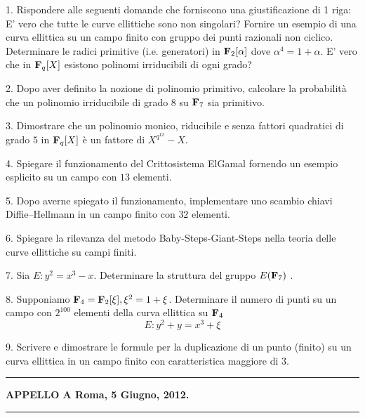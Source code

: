 \item{1.} Rispondere alle seguenti domande che forniscono una giustificazione di 1 riga:\bigskip
{} E' vero che tutte le curve ellittiche sono non singolari?
 Fornire un esempio di una curva ellittica su un campo finito con gruppo dei
punti razionali non ciclico.
 Determinare le radici primitive (i.e. generatori) in ${\bf F}_2[\alpha]$ dove $\alpha^4=1+\alpha$.
 E' vero che in ${\bf F}_q[X]$ esistono polinomi irriducibili di ogni grado?
\item{2.} Dopo aver definito la nozione di polinomio primitivo, calcolare la probabilit\`a che un polinomio irriducibile di grado $8$ su ${\bf F}_7$ sia 
primitivo.
\item{3.} Dimostrare che un polinomio monico, riducibile e senza fattori quadratici di grado $5$ in ${\bf F}_q[X]$ \`e un
fattore di $X^{q^{12}}-X$. \item{4.} Spiegare il funzionamento del Crittosistema ElGamal fornendo un esempio esplicito su un campo con $13$ elementi.
\item{5.} Dopo averne spiegato il funzionamento, implementare uno scambio chiavi Diffie--Hellmann in un campo finito
con $32$ elementi.
\item{6.} Spiegare la rilevanza del metodo Baby-Steps-Giant-Steps nella teoria delle curve ellittiche su campi finiti.
\item{7.} Sia $E: y^2=x^3-x$. Determinare la struttura del gruppo $E({\bf F}_7)$ .
\item{8.} Supponiamo ${\bf F}_4={\bf F}_2[\xi], \xi^2=1+\xi$. 
Determinare il numero di punti su un campo con $2^{100}$ elementi della curva ellittica su ${\bf F}_4$ 
$$E: y^2+y=x^3+\xi$$
\item{9.} Scrivere e dimostrare le formule per la duplicazione di un punto (finito) su un curva ellittica in un campo
finito con caratteristica maggiore di $3$.
\bigskip

\smallskip\hrule\smallskip
\centerline{{\bf APPELLO A \hfill Roma, 5 Giugno, 2012.}}\smallskip\hrule\smallskip

